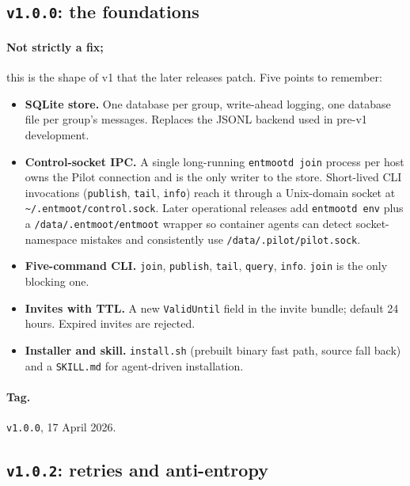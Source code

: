\documentclass[11pt,a4paper]{article}
\begin{document}
\subsection{\texttt{v1.0.0}: the foundations}

\paragraph*{Not strictly a fix;} this is the shape of v1 that
the later releases patch. Five points to remember:

\begin{itemize}[leftmargin=1.2em]
    \item \textbf{SQLite store.} One database per group,
    write-ahead logging, one database file per group's
    messages. Replaces the JSONL backend used in pre-v1
    development.
    \item \textbf{Control-socket IPC.} A single long-running
    \texttt{entmootd join} process per host owns the Pilot
    connection and is the only writer to the store. Short-lived
    CLI invocations (\texttt{publish}, \texttt{tail},
    \texttt{info}) reach it through a Unix-domain socket at
    \texttt{\~{}/.entmoot/control.sock}.
    Later operational releases add \texttt{entmootd env} plus a
    \texttt{/data/.entmoot/entmoot} wrapper so container agents can
    detect socket-namespace mistakes and consistently use
    \texttt{/data/.pilot/pilot.sock}.
    \item \textbf{Five-command CLI.} \texttt{join},
    \texttt{publish}, \texttt{tail}, \texttt{query},
    \texttt{info}. \texttt{join} is the only blocking one.
    \item \textbf{Invites with TTL.} A new \texttt{ValidUntil}
    field in the invite bundle; default 24 hours. Expired
    invites are rejected.
    \item \textbf{Installer and skill.}
    \texttt{install.sh} (prebuilt binary fast path, source fall
    back) and a \texttt{SKILL.md} for agent-driven installation.
\end{itemize}

\paragraph*{Tag.} \texttt{v1.0.0}, 17 April 2026.

\subsection{\texttt{v1.0.2}: retries and anti-entropy}
\end{document}
